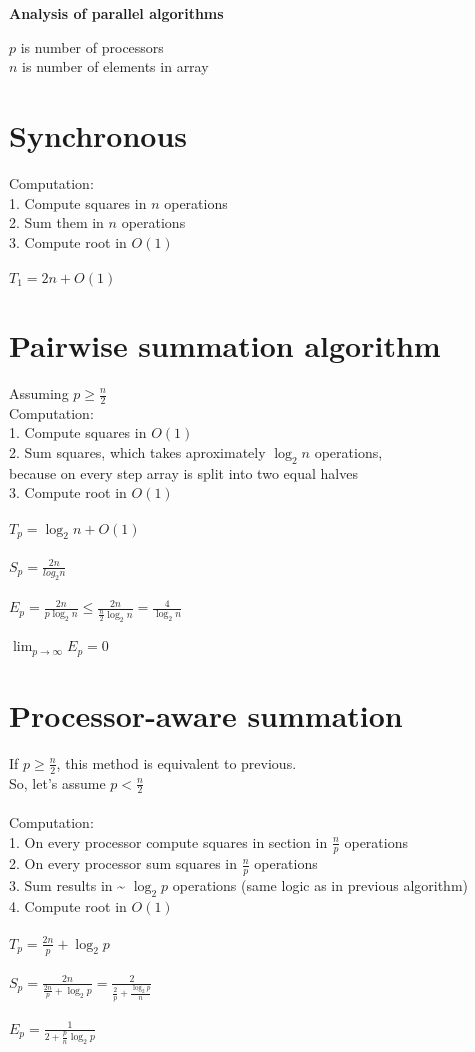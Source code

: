 \documentclass{article}
\begin{document}
\centerline{\bf Analysis of parallel algorithms}
$p$ is number of processors\\
$n$ is number of elements in array
\section{Synchronous}
Computation:\\
1. Compute squares in $n$ operations\\
2. Sum them in $n$ operations\\
3. Compute root in $O(1)$\\
\\
$T_{1} = 2n + O(1)$\\

\section{Pairwise summation algorithm}
Assuming $p \geq \frac{n}{2}$\\
Computation:\\
1. Compute squares in $O(1)$\\
2. Sum squares, which takes aproximately $\log_{2}{n}$ operations,\\
because on every step array is split into two equal halves\\
3. Compute root in $O(1)$\\
\\
$T_p = \log_2{n} + O(1)$\\
\\
$S_p = \frac{2n}{log_2{n}}$\\
\\
$E_p = \frac{2n}{p\log_2{n}} \leq \frac{2n}{\frac{n}{2}\log_2{n}} = \frac{4}{\log_2{n}}$\\
\\
$\lim_{p \rightarrow \infty}{E_p} = 0$\\
\section{Processor-aware summation}
If $p \geq \frac{n}{2}$, this method is equivalent to previous.\\
So, let's assume $p < \frac{n}{2}$\\
\\
Computation:\\
1. On every processor compute squares in section in $\frac{n}{p}$ operations\\
2. On every processor sum squares in $\frac{n}{p}$ operations\\
3. Sum results in \~{} $\log_2{p}$ operations (same logic as in previous algorithm)\\
4. Compute root in $O(1)$\\
\\
$T_p = \frac{2n}{p} + \log_2{p}$\\
\\
$S_p = \frac{2n}{\frac{2n}{p} + \log_2{p}} = \frac{2}{\frac{2}{p} + \frac{\log_2{p}}{n}}$\\
\\
$E_p = \frac{1}{2 + \frac{p}{n}\log_2{p}}$
\end{document}
